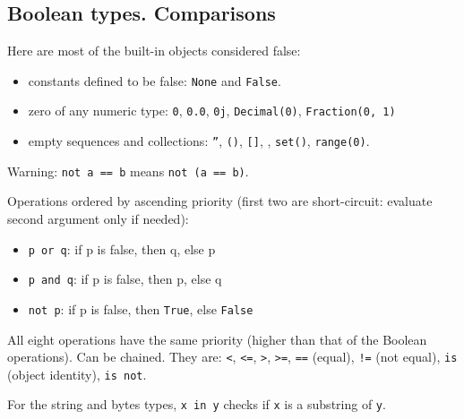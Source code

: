 \subsection{Boolean types. Comparisons}
Here are most of the built-in objects considered false:
\begin{itemize}
\item constants defined to be false: \texttt{None} and \texttt{False}.
\item zero of any numeric type: \texttt{0}, \texttt{0.0}, \texttt{0j}, \texttt{Decimal(0)}, \texttt{Fraction(0, 1)}
\item empty sequences and collections: \texttt{''}, \texttt{()}, \texttt{[]}, \texttt{{}}, \texttt{set()}, \texttt{range(0)}.
\end{itemize}

Warning: \texttt{not a == b} means \texttt{not (a == b)}.

Operations ordered by ascending priority (first two are short-circuit: evaluate second argument only if needed):
\begin{itemize}
	\item \texttt{p or q}: if p is false, then q, else p
	\item \texttt{p and q}: if p is false, then p, else q
	\item \texttt{not p}: if p is false, then \texttt{True}, else \texttt{False}
\end{itemize}

All eight operations have the same priority (higher than that of the Boolean operations).
Can be chained.
They are: 
\texttt{<}, 
\texttt{<=}, 
\texttt{>}, 
\texttt{>=}, 
\texttt{==} (equal), 
\texttt{!=} (not equal), 
\texttt{is} (object identity), 
\texttt{is not}.

For the string and bytes types, \texttt{x in y} checks if \texttt{x} is a substring of \texttt{y}.

%